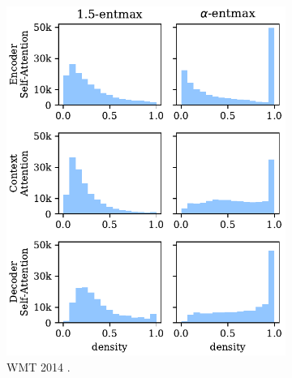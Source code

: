 \begin{figure}[!htbp]
    \begin{subfigure}[b]{.49\linewidth}
        \includegraphics[width=\linewidth]{Figures/hist_densities.pdf}
        \caption{%
            \label{fig:hist_densities_en}%
            WMT 2014 .}
    \end{subfigure}
    \begin{subfigure}[b]{.49\linewidth}

\end{subfigure}
\end{figure}
